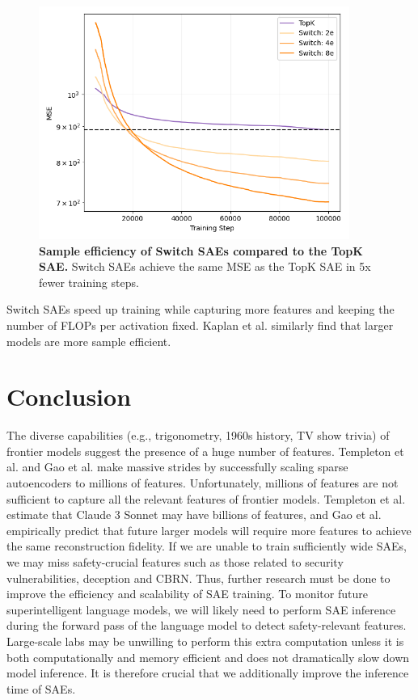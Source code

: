 \documentclass{article} %
\begin{document}
\begin{figure}[h]
\begin{center}
\includegraphics[width=4in]{fig/efficiency.png}
\end{center}
\caption{\textbf{Sample efficiency of Switch SAEs compared to the TopK SAE.} Switch SAEs achieve the same MSE as the TopK SAE in 5x fewer training steps.}
\end{figure}

Switch SAEs speed up training while capturing more features and keeping the number of FLOPs per activation fixed. Kaplan et al. similarly find that larger models are more sample efficient.



\section{Conclusion}
The diverse capabilities (e.g., trigonometry, 1960s history, TV show trivia) of frontier models suggest the presence of a huge number of features. Templeton et al. and Gao et al. make massive strides by successfully scaling sparse autoencoders to millions of features. Unfortunately, millions of features are not sufficient to capture all the relevant features of frontier models. Templeton et al. estimate that Claude 3 Sonnet may have billions of features, and Gao et al. empirically predict that future larger models will require more features to achieve the same reconstruction fidelity. If we are unable to train sufficiently wide SAEs, we may miss safety-crucial features such as those related to security vulnerabilities, deception and CBRN. Thus, further research must be done to improve the efficiency and scalability of SAE training. To monitor future superintelligent language models, we will likely need to perform SAE inference during the forward pass of the language model to detect safety-relevant features. Large-scale labs may be unwilling to perform this extra computation unless it is both computationally and memory efficient and does not dramatically slow down model inference. It is therefore crucial that we additionally improve the inference time of SAEs.
\end{document}
